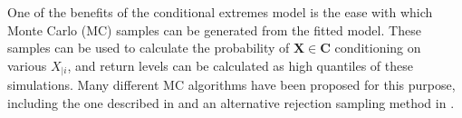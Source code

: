 \documentclass{article}
\numberwithin{equation}{section}
\begin{document}
One of the benefits of the conditional extremes model is the ease with which Monte Carlo (MC) samples can be generated from the fitted model.
These samples can be used to calculate the probability of $\bm{X} \in \bm{C}$ conditioning on various $X_{\mid i}$, and return levels can be calculated as high quantiles of these simulations.
Many different MC algorithms have been proposed for this purpose, including the one described in \cite{Heffernan2004} and an alternative rejection sampling method in \cite{Keef2012_flooding}.




\end{document}
